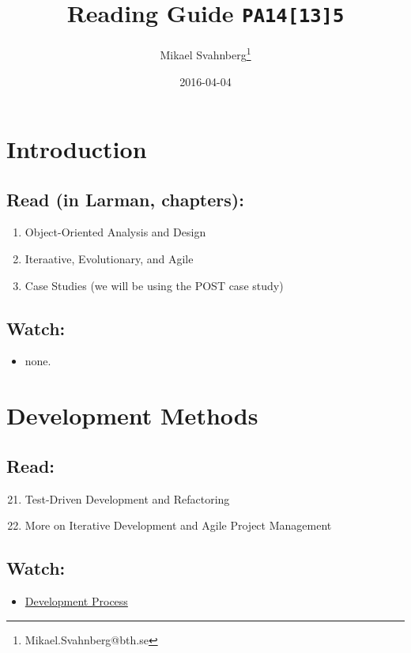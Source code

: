 \documentclass[10pt,t,a4paper]{article}
\author{Mikael Svahnberg\thanks{Mikael.Svahnberg@bth.se}}
\date{2016-04-04}
\title{Reading Guide \texttt{PA14[13]5}}
\begin{document}
\maketitle


\section{Introduction}
\label{sec-1}
\subsection{Read (in Larman, chapters):}
\label{sec-1-1}
\begin{enumerate}
\item Object-Oriented Analysis and Design
\item Iteraative, Evolutionary, and Agile
\item Case Studies (we will be using the POST case study)
\end{enumerate}

\subsection{Watch:}
\label{sec-1-2}
\begin{itemize}
\item none.
\end{itemize}
\section{Development Methods}
\label{sec-2}
\subsection{Read:}
\label{sec-2-1}
\begin{enumerate}
\setcounter{enumi}{20}
\item Test-Driven Development and Refactoring
\setcounter{enumi}{39}
\item More on Iterative Development and Agile Project Management
\end{enumerate}

\subsection{Watch:}
\label{sec-2-2}
\begin{itemize}
\item \href{https://play.bth.se/media/Development+Process/1_gmy3m68z/41750261}{Development Process}
\end{itemize}
\end{document}
